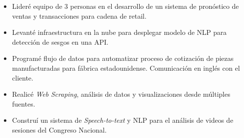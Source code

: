\documentclass[10pt,a4paper]{altacv}
\begin{document}

\begin{fullwidth}
\makecvheader
\end{fullwidth}


\begin{itemize}
\item Lideré equipo de 3 personas en el desarrollo de un sistema de pronóstico de ventas y transacciones para cadena de retail. 
\item Levanté infraestructura en la nube para desplegar modelo de NLP para detección de sesgos en una API.
\item Programé flujo de datos para automatizar proceso de cotización de piezas manufacturadas para fábrica estadounidense. Comunicación en inglés con el cliente.
\item Realicé \textit{Web Scraping}, análisis de datos y visualizaciones desde múltiples fuentes.
\item Construí un sistema de \textit{Speech-to-text} y NLP para el análisis de videos de sesiones del Congreso Nacional.

\end{itemize}
\end{document}
